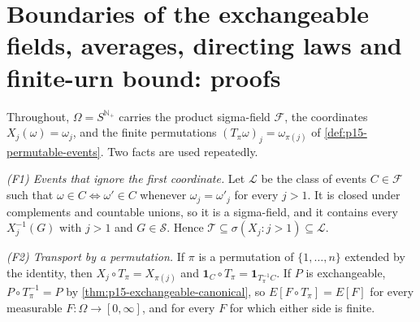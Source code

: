 \section{Boundaries of the exchangeable fields, averages, directing laws and finite-urn bound: proofs}
\label{sec:annex-p15-w02c-p15-022}

Throughout, \(\Omega=S^{\mathbb N_+}\) carries the product sigma-field
\(\mathcal F\), the coordinates \(X_j(\omega)=\omega_j\), and the finite
permutations \((T_\pi\omega)_j=\omega_{\pi(j)}\) of
\cref{def:p15-permutable-events}. Two facts are used repeatedly.

\emph{(F1) Events that ignore the first coordinate.} Let
\(\mathcal L\) be the class of events \(C\in\mathcal F\) such that
\(\omega\in C\Leftrightarrow\omega'\in C\) whenever
\(\omega_j=\omega'_j\) for every \(j>1\). It is closed under complements
and countable unions, so it is a sigma-field, and it contains every
\(X_j^{-1}(G)\) with \(j>1\) and \(G\in\mathcal S\). Hence
\(\mathcal T\subseteq\sigma(X_j:j>1)\subseteq\mathcal L\).

\emph{(F2) Transport by a permutation.} If \(\pi\) is a permutation of
\(\{1,\ldots,n\}\) extended by the identity, then
\(X_j\circ T_\pi=X_{\pi(j)}\) and
\(\mathbf1_C\circ T_\pi=\mathbf1_{T_\pi^{-1}C}\). If \(P\) is
exchangeable, \(P\circ T_\pi^{-1}=P\) by
\cref{thm:p15-exchangeable-canonical}, so
\(E[F\circ T_\pi]=E[F]\) for every measurable \(F:\Omega\to[0,\infty]\),
and for every \(F\) for which either side is finite.


